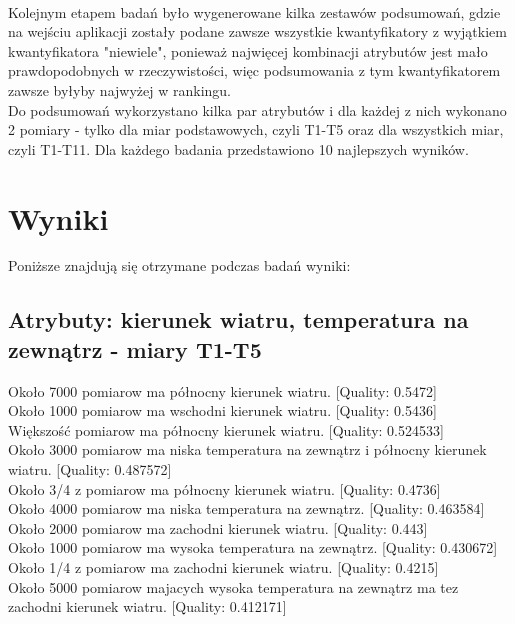 \documentclass{classrep}
\begin{document}
\paragraph{}
Kolejnym etapem badań było wygenerowane kilka zestawów podsumowań, gdzie na wejściu aplikacji zostały podane zawsze wszystkie kwantyfikatory z wyjątkiem kwantyfikatora "niewiele", ponieważ najwięcej kombinacji atrybutów jest mało prawdopodobnych w rzeczywistości, więc podsumowania z tym kwantyfikatorem zawsze byłyby najwyżej w rankingu.\\
Do podsumowań wykorzystano kilka par atrybutów i dla każdej z nich wykonano 2 pomiary - tylko dla miar podstawowych, czyli T1-T5 oraz dla wszystkich miar, czyli T1-T11. Dla każdego badania przedstawiono 10 najlepszych wyników.

\section{Wyniki}
Poniższe znajdują się otrzymane podczas badań wyniki:

\subsection{Atrybuty: kierunek wiatru, temperatura na zewnątrz - miary T1-T5}

Około 7000 pomiarow ma północny kierunek wiatru. [Quality: 0.5472]\\
Około 1000 pomiarow ma wschodni kierunek wiatru. [Quality: 0.5436]\\
Większość pomiarow ma północny kierunek wiatru. [Quality: 0.524533]\\
Około 3000 pomiarow ma niska temperatura na zewnątrz i północny kierunek wiatru. [Quality: 0.487572]\\
Około 3/4 z pomiarow ma północny kierunek wiatru. [Quality: 0.4736]\\
Około 4000 pomiarow ma niska temperatura na zewnątrz. [Quality: 0.463584]\\
Około 2000 pomiarow ma zachodni kierunek wiatru. [Quality: 0.443]\\
Około 1000 pomiarow ma wysoka temperatura na zewnątrz. [Quality: 0.430672]\\
Około 1/4 z pomiarow ma zachodni kierunek wiatru. [Quality: 0.4215]\\
Około 5000 pomiarow majacych wysoka temperatura na zewnątrz ma tez zachodni kierunek wiatru. [Quality: 0.412171]\\
\end{document}
